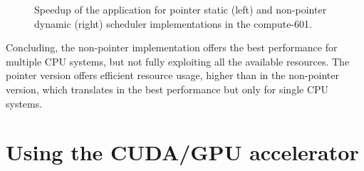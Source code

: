 \begin{figure}[!htp]
	\begin{center}
		\caption{Speedup of the \tth application for pointer static (left) and non-pointer dynamic (right) scheduler implementations in the compute-601.}
		\label{fig:Speedup601}
	\end{center}
\end{figure}

Concluding, the non-pointer implementation offers the best performance for multiple CPU systems, but not fully exploiting all the available resources. The pointer version offers efficient resource usage, higher than in the non-pointer version, which translates in the best performance but only for single CPU systems.

\section{Using the \nvidia CUDA/GPU accelerator}
\label{Parallelization:GPU}


